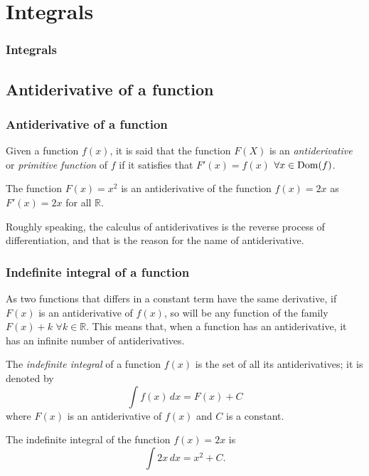 
\section{Integrals}
\begin{frame}
\frametitle{Integrals}
\tableofcontents[sectionstyle=show/hide,hideothersubsections]
\end{frame}



\subsection{Antiderivative of a function}
\begin{frame}
\frametitle{Antiderivative of a function}
\begin{definition}
Given a function $f(x)$, it is said that the function $F(X)$ is an \emph{antiderivative} or \emph{primitive function} of $f$ if it satisfies that $F'(x)=f(x)$ $\forall x \in {\operatorname{Dom}}(f)$.
\end{definition}

 The function $F(x)=x^2$ is an antiderivative of the function $f(x)=2x$ as $F'(x)=2x$ for all $\mathbb{R}$.

Roughly speaking, the calculus of antiderivatives is the reverse process of differentiation, and that is the reason for the name of antiderivative. 
\end{frame}


\begin{frame}
\frametitle{Indefinite integral of a function}
As two functions that differs in a constant term have the same derivative, if $F(x)$ is an antiderivative of $f(x)$, so will be any function of the family $F(x)+k$ $\forall k \in \mathbb{R}$.
This means that, when a function has an antiderivative, it has an infinite number of antiderivatives. 

\begin{definition}
The \emph{indefinite integral} of a function $f(x)$ is the set of all its antiderivatives; it is denoted by
\[
\int{f(x)}\,dx=F(x)+C
\]
where $F(x)$ is an antiderivative of $f(x)$ and $C$ is a constant.
\end{definition}

 The indefinite integral of the function $f(x)=2x$ is
\[\int 2x\, dx = x^2+C.\]
\end{frame}


